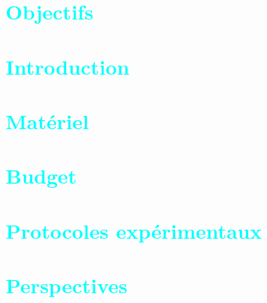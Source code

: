 \documentclass{article}
\begin{document}


\tableofcontents

\newpage

\section{\textcolor{cyan}{Objectifs}}


\section{\textcolor{cyan}{Introduction}}


\section{\textcolor{cyan}{Matériel}}


\section{\textcolor{cyan}{Budget}}


\section{\textcolor{cyan}{Protocoles expérimentaux}}


\section{\textcolor{cyan}{Perspectives}}




\end{document}
